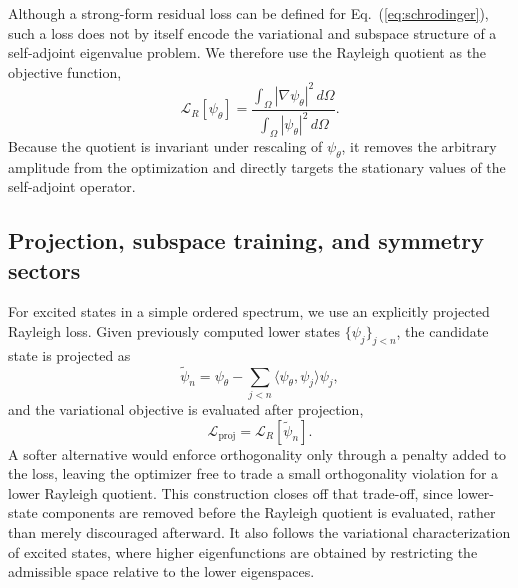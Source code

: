 \documentclass[10pt,onecolumn]{article}
\begin{document}
Although a strong-form residual loss can be defined for Eq.~(\ref{eq:schrodinger}), such a loss does not by itself encode the variational and subspace structure of a self-adjoint eigenvalue problem. We therefore use the Rayleigh quotient as the objective function,
\begin{equation}
\mathcal{L}_{R}[\psi_\theta]
=
\frac{
\int_\Omega |\nabla\psi_\theta|^2\,d\Omega
}{
\int_\Omega |\psi_\theta|^2\,d\Omega
}.
\label{eq:rayleighloss}
\end{equation}
Because the quotient is invariant under rescaling of $\psi_\theta$, it removes the arbitrary amplitude from the optimization and directly targets the stationary values of the self-adjoint operator.

\subsection{Projection, subspace training, and symmetry sectors}

For excited states in a simple ordered spectrum, we use an explicitly projected Rayleigh loss. Given previously computed lower states $\{\psi_j\}_{j<n}$, the candidate state is projected as
\begin{equation}
\widetilde{\psi}_n
=
\psi_\theta
-
\sum_{j<n}
\langle\psi_\theta,\psi_j\rangle\psi_j,
\end{equation}
and the variational objective is evaluated after projection,
\begin{equation}
\mathcal{L}_{\mathrm{proj}}
=
\mathcal{L}_{R}[\widetilde{\psi}_n].
\label{eq:projloss}
\end{equation}
A softer alternative would enforce orthogonality only through a penalty added to the loss, leaving the optimizer free to trade a small orthogonality violation for a lower Rayleigh quotient. This construction closes off that trade-off, since lower-state components are removed before the Rayleigh quotient is evaluated, rather than merely discouraged afterward. It also follows the variational characterization of excited states, where higher eigenfunctions are obtained by restricting the admissible space relative to the lower eigenspaces.
\end{document}
